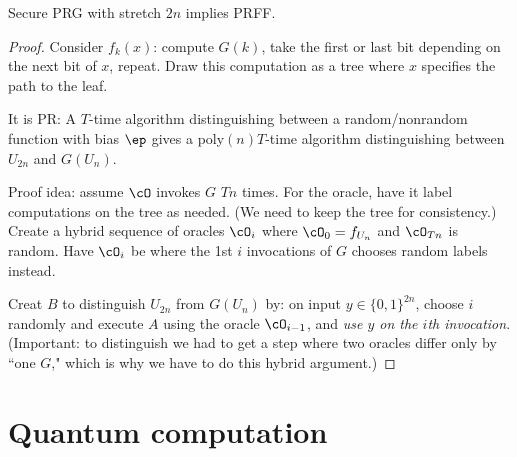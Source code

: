 \begin{thm}
Secure PRG with stretch $2n$ implies PRFF.
\end{thm}
\begin{proof}Consider $f_k(x)$: compute $G(k)$, take the first or last bit depending on the next bit of $x$, repeat. Draw this computation as a tree where $x$ specifies the path to the leaf.

It is PR: A $T$-time algorithm distinguishing between a random/nonrandom function with bias $\ep$ gives a poly$(n)T$-time algorithm distinguishing between $U_{2n}$ and $G(U_n)$.

Proof idea: assume $\cO$ invokes $G$ $Tn$ times. For the oracle, have it label computations on the tree as needed. (We need to keep the tree for consistency.) Create a hybrid sequence of oracles $\cO_i$ where $\cO_0=f_{U_n}$ and $\cO_{Tn}$ is random. Have $\cO_i$ be where the 1st $i$ invocations of $G$ chooses random labels instead. 

Creat $B$ to distinguish $U_{2n}$ from $G(U_n)$ by: on input $y\in\{0,1\}^{2n}$, choose $i$ randomly and execute $A$ using the oracle $\cO_{i-1}$, and {\it use $y$ on the $i$th invocation}. (Important: to distinguish we had to get a step where two oracles differ only by ``one $G$," which is why we have to do this hybrid argument.)
\end{proof}


\section{Quantum computation}
